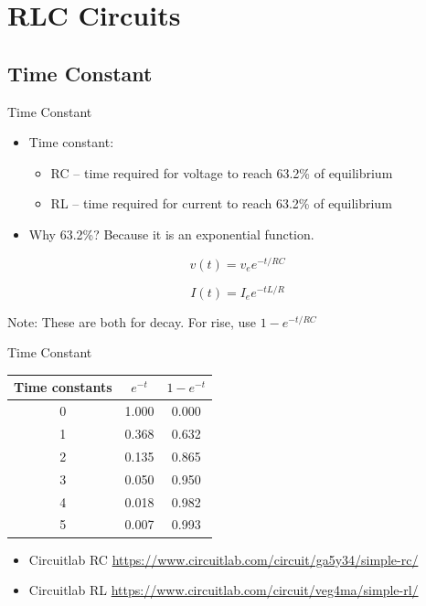 \documentclass{beamer}
\begin{document}
\section{RLC Circuits}

\subsection{Time Constant}
\begin{frame}{Time Constant}{}
\begin{itemize}
\item Time constant: 
\begin{itemize}
\item RC – time required for voltage to reach 63.2\% of equilibrium
\item RL – time required for current to reach 63.2\% of equilibrium
\end{itemize}
\item Why 63.2\%?  Because it is an exponential function.
\end{itemize}
\parbox{0.48\textwidth}{

\[v(t)=v_e e^{-t/RC}\]
}
\parbox{0.48\textwidth}{

\[I(t)=I_e e^{-tL/R}\]
}
Note: These are both for decay.  For rise, use $1-e^{-t/RC}$
\end{frame}

\begin{frame}{Time Constant}{}
\begin{tabular}{ccc}
Time constants & $e^{-t}$ & $1-e^{-t}$ \\
\hline  
0&	1.000&	0.000\\
1&	0.368&	0.632\\
2&	0.135&	0.865\\
3&	0.050&	0.950\\
4&	0.018&	0.982\\
5&	0.007&	0.993\\
\hline
\end{tabular}

\begin{itemize}
\item Circuitlab RC \url{https://www.circuitlab.com/circuit/ga5y34/simple-rc/}
\item Circuitlab RL \url{https://www.circuitlab.com/circuit/veg4ma/simple-rl/}
\end{itemize}
\end{frame}
\end{document}
